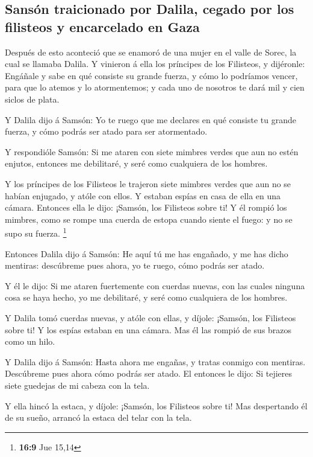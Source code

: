 \hypertarget{sansuxf3n-traicionado-por-dalila-cegado-por-los-filisteos-y-encarcelado-en-gaza}{%
\subsection{Sansón traicionado por Dalila, cegado por los filisteos y
encarcelado en
Gaza}\label{sansuxf3n-traicionado-por-dalila-cegado-por-los-filisteos-y-encarcelado-en-gaza}}

 Después de esto aconteció que se enamoró de una mujer en el
valle de Sorec, la cual se llamaba Dalila.  Y vinieron á
ella los príncipes de los Filisteos, y dijéronle: Engáñale y sabe en qué
consiste su grande fuerza, y cómo lo podríamos vencer, para que lo
atemos y lo atormentemos; y cada uno de nosotros te dará mil y cien
siclos de plata.

 Y Dalila dijo á Samsón: Yo te ruego que me declares en qué
consiste tu grande fuerza, y cómo podrás ser atado para ser atormentado.

 Y respondióle Samsón: Si me ataren con siete mimbres verdes
que aun no estén enjutos, entonces me debilitaré, y seré como cualquiera
de los hombres.

 Y los príncipes de los Filisteos le trajeron siete mimbres
verdes que aun no se habían enjugado, y atóle con ellos.  Y
estaban espías en casa de ella en una cámara. Entonces ella le dijo:
¡Samsón, los Filisteos sobre ti! Y él rompió los mimbres, como se rompe
una cuerda de estopa cuando siente el fuego: y no se supo su fuerza.
\footnote{\textbf{16:9} Jue 15,14}

 Entonces Dalila dijo á Samsón: He aquí tú me has engañado,
y me has dicho mentiras: descúbreme pues ahora, yo te ruego, cómo podrás
ser atado.

 Y él le dijo: Si me ataren fuertemente con cuerdas nuevas,
con las cuales ninguna cosa se haya hecho, yo me debilitaré, y seré como
cualquiera de los hombres.

 Y Dalila tomó cuerdas nuevas, y atóle con ellas, y díjole:
¡Samsón, los Filisteos sobre ti! Y los espías estaban en una cámara. Mas
él las rompió de sus brazos como un hilo.

 Y Dalila dijo á Samsón: Hasta ahora me engañas, y tratas
conmigo con mentiras. Descúbreme pues ahora cómo podrás ser atado. El
entonces le dijo: Si tejieres siete guedejas de mi cabeza con la tela.

 Y ella hincó la estaca, y díjole: ¡Samsón, los Filisteos
sobre ti! Mas despertando él de su sueño, arrancó la estaca del telar
con la tela.

